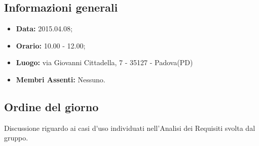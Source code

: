 \subsection{Informazioni generali}
\begin{itemize}
	\item \textbf{Data:} 2015.04.08;
	\item \textbf{Orario:} 10.00 - 12.00;
	\item \textbf{Luogo:} via Giovanni Cittadella, 7 - 35127 - Padova(PD)
	\item \textbf{Membri Assenti:} Nessuno.
\end{itemize}

\subsection{Ordine del giorno}
Discussione riguardo ai \gls{casi d'uso} individuati nell'Analisi dei Requisiti svolta dal gruppo.

